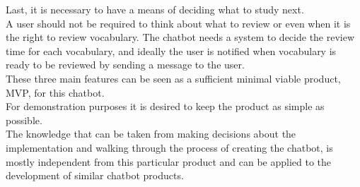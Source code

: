 Last, it is necessary to have a means of deciding what to study next.
\\
A user should not be required to think about what to review or even when it is the right to review vocabulary.
The chatbot needs a system to decide the review time for each vocabulary,
and ideally the user is notified when vocabulary is ready to be reviewed by sending a message to the user.
\\


These three main features can be seen as a sufficient minimal viable product, MVP, for this chatbot.
\\
For demonstration purposes it is desired to keep the product as simple as possible.
\\
The knowledge that can be taken from making decisions about the implementation and walking through the process of creating the chatbot,
is mostly independent from this particular product and can be applied to the development of similar chatbot products.

